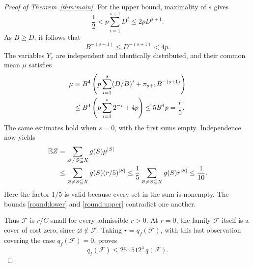 \begin{proof}[Proof of Theorem~\ref{thm:main}]
For the upper bound, maximality of $s$ gives
\[
 \frac12<p\sum_{i=1}^{s+1}D^i\le2pD^{s+1}.
\]
As $B\ge D$, it follows that
\begin{equation}\label{round:tail}
 B^{-(s+1)}\le D^{-(s+1)}<4p.
\end{equation}
The variables $Y_x$ are independent and identically distributed, and
their common mean $\mu$ satisfies
\begin{align}
 \mu
 &=B^4\left(p\sum_{i=1}^s(D/B)^i
            +\pi_{s+1}B^{-(s+1)}\right)\notag\\
 &\le B^4\left(p\sum_{i=1}^s2^{-i}+4p\right)
 \le5B^4p=\frac r5.\label{round:mean}
\end{align}
The same estimates hold when $s=0$, with the first sums empty.
Independence now yields
\begin{align}
 \mathbb E Z
 &=\sum_{\varnothing\ne S\subseteq X}g(S)\mu^{|S|}\notag\\
 &\le\sum_{\varnothing\ne S\subseteq X}g(S)(r/5)^{|S|}
 \le\frac15\sum_{\varnothing\ne S\subseteq X}g(S)r^{|S|}
 \le\frac1{10}.\label{round:upper}
\end{align}
Here the factor $1/5$ is valid because every set in the sum is
nonempty. The bounds \eqref{round:lower} and \eqref{round:upper}
contradict one another.

Thus $\mathcal F$ is $r/C$-small for every admissible $r>0$. At $r=0$,
the family $\mathcal F$ itself is a cover of cost zero, since
$\varnothing\notin\mathcal F$. Taking $r=q_f(\mathcal F)$, with this
last observation covering the case $q_f(\mathcal F)=0$, proves
\[
 q_f(\mathcal F)\le25\cdot512^4\,q(\mathcal F).
\]
\end{proof}
